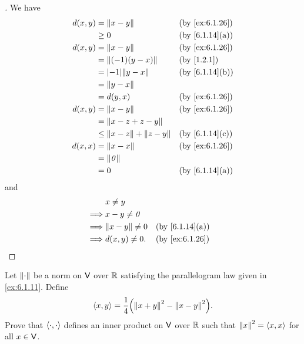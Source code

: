 \begin{proof}[]
  We have
  \begin{align*}
    d(x, y) & = \norm{x - y}                   &  & \text{(by \cref{ex:6.1.26})} \\
            & \geq 0                           &  & \text{(by \cref{6.1.14}(a))} \\
    d(x, y) & = \norm{x - y}                   &  & \text{(by \cref{ex:6.1.26})} \\
            & = \norm{(-1)(y - x)}             &  & \text{(by \cref{1.2.1})}     \\
            & = \abs{-1} \norm{y - x}          &  & \text{(by \cref{6.1.14}(b))} \\
            & = \norm{y - x}                                                     \\
            & = d(y, x)                        &  & \text{(by \cref{ex:6.1.26})} \\
    d(x, y) & = \norm{x - y}                   &  & \text{(by \cref{ex:6.1.26})} \\
            & = \norm{x - z + z - y}                                             \\
            & \leq \norm{x - z} + \norm{z - y} &  & \text{(by \cref{6.1.14}(c))} \\
    d(x, x) & = \norm{x - x}                   &  & \text{(by \cref{ex:6.1.26})} \\
            & = \norm{\zv}                                                       \\
            & = 0                              &  & \text{(by \cref{6.1.14}(a))}
  \end{align*}
  and
  \begin{align*}
             & x \neq y                                              \\
    \implies & x - y \neq \zv                                        \\
    \implies & \norm{x - y} \neq 0 &  & \text{(by \cref{6.1.14}(a))} \\
    \implies & d(x, y) \neq 0.     &  & \text{(by \cref{ex:6.1.26})}
  \end{align*}
\end{proof}

\begin{ex}\label{ex:6.1.27}
  Let \(\left\lVert\cdot\right\rVert\) be a norm on \(\mathsf{V}\) over \(\mathbb{R}\) satisfying the parallelogram law given in \cref{ex:6.1.11}.
  Define
  \[
    \inn{x, y} = \frac{1}{4} \pa{\norm{x + y}^2 - \norm{x - y}^2}.
  \]
  Prove that \(\left\langle\cdot, \cdot\right\rangle\) defines an inner product on \(\mathsf{V}\) over \(\mathbb{R}\) such that \(\left\lVert x\right\rVert^2 = \left\langle x, x\right\rangle\) for all \(x \in \mathsf{V}\).
\end{ex}

